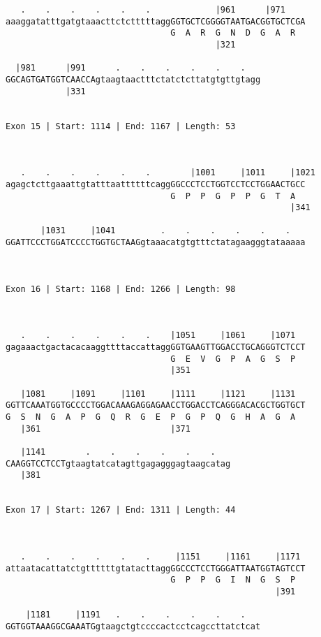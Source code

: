 \documentclass{article}
\begin{document}
\begin{Verbatim}
   .    .    .    .    .    .             |961      |971    
aaaggatatttgatgtaaacttctctttttaggGGTGCTCGGGGTAATGACGGTGCTCGA
                                 G  A  R  G  N  D  G  A  R  
                                          |321              
  
  |981      |991      .    .    .    .    .    .   
GGCAGTGATGGTCAACCAgtaagtaactttctatctcttatgtgttgtagg
            |331                                   
  
 
Exon 15 | Start: 1114 | End: 1167 | Length: 53



   .    .    .    .    .    .        |1001     |1011     |1021
agagctcttgaaattgtatttaattttttcaggGGCCCTCCTGGTCCTCCTGGAACTGCC
                                 G  P  P  G  P  P  G  T  A  
                                                         |341
  
       |1031     |1041         .    .    .    .    .    .   
GGATTCCCTGGATCCCCTGGTGCTAAGgtaaacatgtgtttctatagaagggtataaaaa
                                                            
  
 
Exon 16 | Start: 1168 | End: 1266 | Length: 98



   .    .    .    .    .    .    |1051     |1061     |1071  
gagaaactgactacacaaggttttaccattaggGGTGAAGTTGGACCTGCAGGGTCTCCT
                                 G  E  V  G  P  A  G  S  P  
                                 |351                       
  
   |1081     |1091     |1101     |1111     |1121     |1131  
GGTTCAAATGGTGCCCCTGGACAAAGAGGAGAACCTGGACCTCAGGGACACGCTGGTGCT
G  S  N  G  A  P  G  Q  R  G  E  P  G  P  Q  G  H  A  G  A  
   |361                          |371                       
  
   |1141        .    .    .    .    .    .   
CAAGGTCCTCCTgtaagtatcatagttgagagggagtaagcatag
   |381                                      
  
 
Exon 17 | Start: 1267 | End: 1311 | Length: 44



   .    .    .    .    .    .     |1151     |1161     |1171 
attaatacattatctgttttttgtatacttaggGGCCCTCCTGGGATTAATGGTAGTCCT
                                 G  P  P  G  I  N  G  S  P  
                                                      |391  
  
    |1181     |1191   .    .    .    .    .    .   
GGTGGTAAAGGCGAAATGgtaagctgtccccactcctcagccttatctcat
                                                   

\end{Verbatim}
\end{document}
